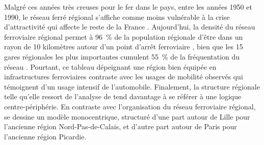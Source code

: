 \begin{refsegment}
Malgré ces années très creuses pour le fer dans le pays, entre les années 1950 et 1990, le réseau ferré régional s'affiche comme moins vulnérable à la crise d'attractivité qui affecte le reste de la France \textcolor{blue}{\autocite[153]{baron_reseaux_2017}}. Aujourd'hui, la densité du réseau ferroviaire régional permet à 96~\% de la population régionale d'être dans un rayon de 10 kilomètres autour d'un point d'arrêt ferroviaire \textcolor{blue}{\autocite[58]{ceser_hauts-de-france_mobilite_2021}}, bien que les 15 gares régionales les plus importantes cumulent 55~\% de la fréquentation du réseau \textcolor{blue}{\autocite[58]{ceser_hauts-de-france_mobilite_2021}}. Pourtant, ce tableau dépeignant une région bien équipée en infrastructures ferroviaires contraste avec les usages de mobilité observés qui témoignent d’un usage intensif de l’automobile. Finalement, la structure régionale telle qu'elle ressort de l'analyse de \textcolor{blue}{\textcite[15]{lhostis_transport_2006}} tend davantage à se référer à une logique centre-périphérie. En contraste avec l'organisation du réseau ferroviaire régional, se dessine un modèle monocentrique, structuré d'une part autour de Lille pour l'ancienne région Nord-Pas-de-Calais, et d'autre part autour de Paris pour l'ancienne région Picardie.%


\end{refsegment}

